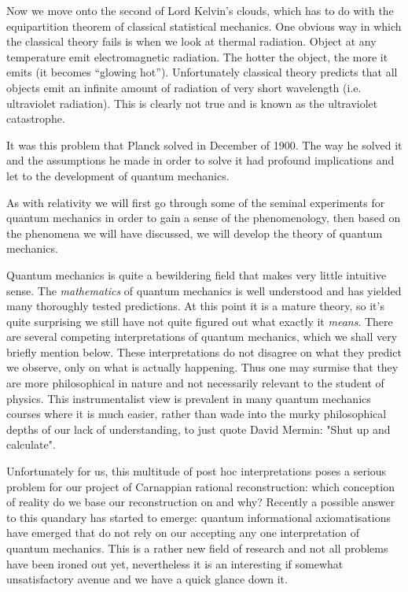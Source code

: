 Now we move onto the second of Lord Kelvin's clouds, which has to do with the equipartition theorem of classical statistical mechanics. One obvious way in which the classical theory fails is when we look at thermal radiation. Object at any temperature emit electromagnetic radiation. The hotter the object, the more it emits (it becomes ``glowing hot''). Unfortunately classical theory predicts that all objects emit an infinite amount of radiation of very short wavelength (i.e. ultraviolet radiation). This is clearly not true and is known as the ultraviolet catastrophe.

It was this problem that Planck solved in December of 1900. The way he solved it and the assumptions he made in order to solve it had profound implications and let to the development of quantum mechanics.

As with relativity we will first go through some of the seminal experiments for quantum mechanics in order to gain a sense of the phenomenology, then based on the phenomena we will have discussed, we will develop the theory of quantum mechanics.

Quantum mechanics is quite a bewildering field that makes very little intuitive sense. The \textit{mathematics} of quantum mechanics is well understood and has yielded many thoroughly tested predictions. At this point it is a mature theory, so it's quite surprising we still have not quite figured out what exactly it \textit{means}. There are several competing interpretations of quantum mechanics, which we shall very briefly mention below. These interpretations do not disagree on what they predict we observe, only on what is actually happening. Thus one may surmise that they are more philosophical in nature and not necessarily relevant to the student of physics. This instrumentalist view is prevalent in many quantum mechanics courses where it is much easier, rather than wade into the murky philosophical depths of our lack of understanding, to just quote David Mermin: "Shut up and calculate".

Unfortunately for us, this multitude of post hoc interpretations poses a serious problem for our project of Carnappian rational reconstruction: which conception of reality do we base our reconstruction on and why? Recently a possible answer to this quandary has started to emerge: quantum informational axiomatisations have emerged that do not rely on our accepting any one interpretation of quantum mechanics. This is a rather new field of research and not all problems have been ironed out yet, nevertheless it is an interesting if somewhat unsatisfactory avenue and we have a quick glance down it.

